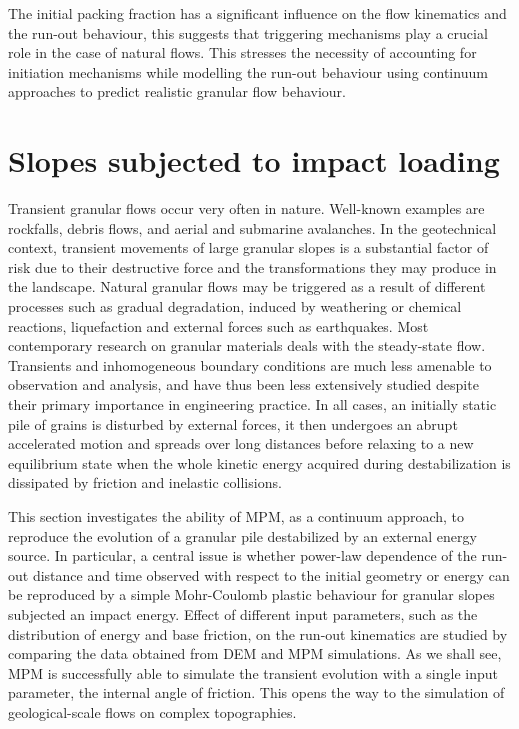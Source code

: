 The initial packing fraction has a significant influence on the flow kinematics 
and the run-out behaviour, this suggests that triggering mechanisms play a
crucial role in the case of natural flows. This stresses the necessity of 
accounting for initiation mechanisms while modelling the run-out behaviour 
using continuum approaches to predict realistic granular flow behaviour.

\section{Slopes subjected to impact loading}

Transient granular flows occur very often in nature. Well-known examples are 
rockfalls, debris flows, and aerial and submarine avalanches. In the 
geotechnical context, transient movements of large granular slopes 
is a substantial factor of risk due to their destructive force and the 
transformations they may produce in the landscape. Natural granular flows 
may be triggered as a result of different processes such as gradual 
degradation, induced by weathering or chemical reactions, liquefaction and 
external forces such as earthquakes. Most contemporary research on granular 
materials deals with the steady-state flow. Transients and inhomogeneous 
boundary conditions are much less amenable to observation and analysis, and 
have thus been less extensively studied despite their primary importance in 
engineering practice. In all cases, an initially static pile of grains is 
disturbed by external forces, it then undergoes an abrupt accelerated motion 
and spreads over long distances before relaxing to a new equilibrium state when 
the whole kinetic energy acquired during destabilization is dissipated
by friction and inelastic collisions.

This section investigates the ability of MPM, as a continuum approach, to 
reproduce the evolution of a granular pile destabilized by an external energy 
source. In particular, a central issue is whether power-law dependence of the 
run-out distance and time observed with respect to the initial geometry or 
energy can be reproduced by a simple Mohr-Coulomb plastic behaviour for 
granular slopes subjected an impact energy. Effect of different input 
parameters, such as the distribution of energy and base friction, on the 
run-out kinematics are studied by comparing the data obtained from DEM and MPM 
simulations. As we shall see, MPM is successfully able to simulate the 
transient evolution with a single input parameter, the internal angle of 
friction. This opens the way to the simulation of geological-scale flows on 
complex topographies.

